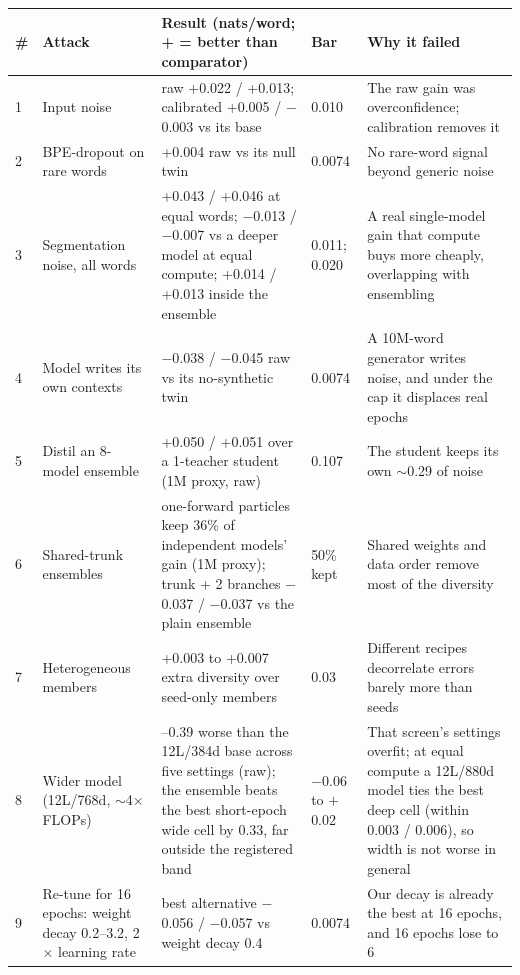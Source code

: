 \documentclass[11pt]{article}
\begin{document}
\begin{table}[t]
\centering
\small
\begin{tabularx}{\textwidth}{@{}l>{\raggedright\arraybackslash}p{3.2cm}>{\raggedright\arraybackslash}X l>{\raggedright\arraybackslash}X@{}}
\toprule
\# & Attack & Result (nats/word; + = better than comparator) & Bar & Why it failed \\
\midrule
1 & Input noise & raw +0.022 / +0.013; calibrated +0.005 / $-$0.003 vs its base & 0.010 & The raw gain was overconfidence; calibration removes it \\
2 & BPE-dropout on rare words \citep{provilkov2020bpedropout} & +0.004 raw vs its null twin & 0.0074 & No rare-word signal beyond generic noise \\
3 & Segmentation noise, all words & +0.043 / +0.046 at equal words; $-$0.013 / $-$0.007 vs a deeper model at equal compute; +0.014 / +0.013 inside the ensemble & 0.011; 0.020 & A real single-model gain that compute buys more cheaply, overlapping with ensembling \\
4 & Model writes its own contexts & $-$0.038 / $-$0.045 raw vs its no-synthetic twin & 0.0074 & A 10M-word generator writes noise, and under the cap it displaces real epochs \\
5 & Distil an 8-model ensemble \citep{timiryasov2023babyllama} & +0.050 / +0.051 over a 1-teacher student (1M proxy, raw) & 0.107 & The student keeps its own $\sim$0.29 of noise \\
6 & Shared-trunk ensembles & one-forward particles keep 36\% of independent models' gain (1M proxy); trunk + 2 branches $-$0.037 / $-$0.037 vs the plain ensemble & 50\% kept & Shared weights and data order remove most of the diversity \\
7 & Heterogeneous members \citep{gontijolopes2022} & +0.003 to +0.007 extra diversity over seed-only members & 0.03 & Different recipes decorrelate errors barely more than seeds \\
8 & Wider model (12L/768d, $\sim$4$\times$ FLOPs) & 0.14--0.39 worse than the 12L/384d base across five settings (raw); the ensemble beats the best short-epoch wide cell by 0.33, far outside the registered band & $-$0.06 to $+$0.02 & That screen's settings overfit; at equal compute a 12L/880d model ties the best deep cell (within 0.003 / 0.006), so width is not worse in general \\
9 & Re-tune for 16 epochs: weight decay 0.2--3.2, 2$\times$ learning rate & best alternative $-$0.056 / $-$0.057 vs weight decay 0.4 & 0.0074 & Our decay is already the best at 16 epochs, and 16 epochs lose to 6 \\

\end{tabularx}
\end{table}
\end{document}
